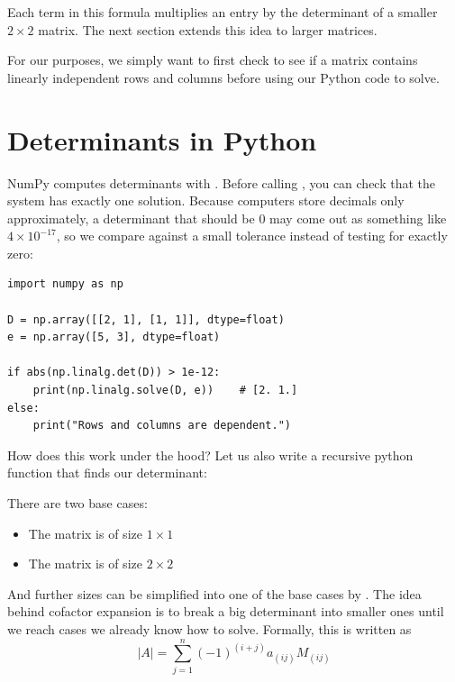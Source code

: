 Each term in this formula multiplies an entry by the determinant of a smaller $2 \times 2$ matrix. The next section extends this idea to larger matrices.

For our purposes, we simply want to first check to see if 
a matrix contains linearly independent rows and columns before using our 
Python code to solve. 


\section{Determinants in Python}
NumPy computes determinants with . Before calling
, you can check that the system has exactly one
solution. Because computers store decimals only approximately, a
determinant that should be 0 may come out as something like
$4 \times 10^{-17}$, so we compare against a small tolerance instead of
testing for exactly zero:
\begin{verbatim}
import numpy as np

D = np.array([[2, 1], [1, 1]], dtype=float)
e = np.array([5, 3], dtype=float)

if abs(np.linalg.det(D)) > 1e-12:
    print(np.linalg.solve(D, e))    # [2. 1.]
else:
    print("Rows and columns are dependent.")
\end{verbatim}

How does this work under the hood? Let us also write a recursive python function that finds our determinant:

There are two base cases:
\begin{itemize}
    \item The matrix is of size $1 \times 1$
    \item The matrix is of size $2 \times 2$
\end{itemize}

And further sizes can be simplified into one of the base cases by . The idea behind cofactor expansion is to break a big determinant into smaller ones until we reach cases we already know how to solve. Formally, this is written as $$|A|=\sum_{j=1}^{n}(-1)^{(i+j)}a_{(ij)}M_{(ij)}$$

